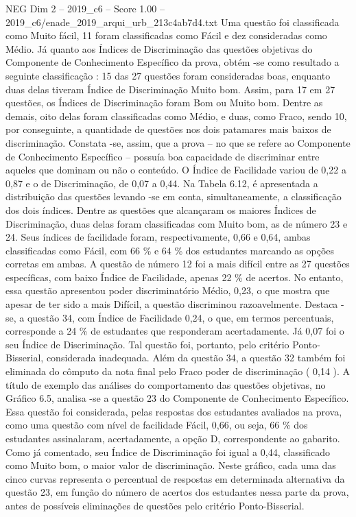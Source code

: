 \begin{textsample}{NEG Dim 2 – 2019\_c6 – Score 1.00 – 2019\_c6/enade\_2019\_arqui\_urb\_213c4ab7d4.txt}
Uma questão foi classificada como Muito fácil, 11 foram classificadas como Fácil e dez consideradas como Médio.
Já quanto aos Índices de Discriminação das questões objetivas do Componente de Conhecimento Específico da prova, obtém -se como resultado a seguinte classificação : 15 das 27 questões foram consideradas boas, enquanto duas delas tiveram Índice de Discriminação Muito bom.
Assim, para 17 em 27 questões, os Índices de Discriminação foram Bom ou Muito bom.
Dentre as demais, oito delas foram classificadas como Médio, e duas, como Fraco, sendo 10, por conseguinte, a quantidade de questões nos dois patamares mais baixos de discriminação.
Constata -se, assim, que a prova – no que se refere ao Componente de Conhecimento Específico – possuía boa capacidade de discriminar entre aqueles que dominam ou não o conteúdo.
O Índice de Facilidade variou de 0,22 a 0,87 e o de Discriminação, de 0,07 a 0,44.
Na Tabela 6.12, é apresentada a distribuição das questões levando -se em conta, simultaneamente, a classificação dos dois índices.
Dentre as questões que alcançaram os maiores Índices de Discriminação, duas delas foram classificadas com Muito bom, as de número 23 e 24.
Seus índices de facilidade foram, respectivamente, 0,66 e 0,64, ambas classificadas como Fácil, com 66 \% e 64 \% dos estudantes marcando as opções corretas em ambas.
A questão de número 12 foi a mais difícil entre as 27 questões específicas, com baixo Índice de Facilidade, apenas 22 \% de acertos.
No entanto, essa questão apresentou poder discriminatório Médio, 0,23, o que mostra que apesar de ter sido a mais Difícil, a questão discriminou razoavelmente.
Destaca -se, a questão 34, com Índice de Facilidade 0,24, o que, em termos percentuais, corresponde a 24 \% de estudantes que responderam acertadamente.
Já 0,07 foi o seu Índice de Discriminação.
Tal questão foi, portanto, pelo critério Ponto-Bisserial, considerada inadequada.
Além da questão 34, a questão 32 também foi eliminada do cômputo da nota final pelo Fraco poder de discriminação ( 0,14 ).
A título de exemplo das análises do comportamento das questões objetivas, no Gráfico 6.5, analisa -se a questão 23 do Componente de Conhecimento Específico.
Essa questão foi considerada, pelas respostas dos estudantes avaliados na prova, como uma questão com nível de facilidade Fácil, 0,66, ou seja, 66 \% dos estudantes assinalaram, acertadamente, a opção D, correspondente ao gabarito.
Como já comentado, seu Índice de Discriminação foi igual a 0,44, classificado como Muito bom, o maior valor de discriminação.
Neste gráfico, cada uma das cinco curvas representa o percentual de respostas em determinada alternativa da questão 23, em função do número de acertos dos estudantes nessa parte da prova, antes de possíveis eliminações de questões pelo critério Ponto-Bisserial.

\end{textsample}
